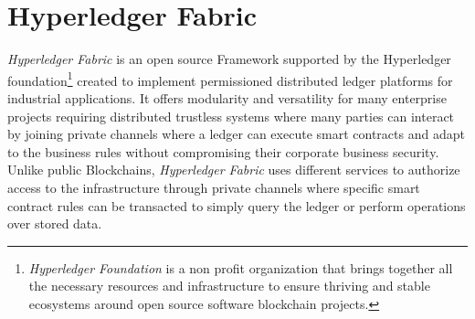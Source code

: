 \section{Hyperledger Fabric}
\emph{Hyperledger Fabric} is an open source Framework supported by the Hyperledger foundation\footnote{
\emph{Hyperledger Foundation}\cite{HyperledgerFoundation:online} is a non profit organization that brings together all the necessary resources and infrastructure to ensure thriving and stable ecosystems around open source software blockchain projects.} created to implement permissioned distributed ledger platforms for industrial applications. It offers modularity and versatility  for many enterprise projects requiring distributed trustless systems where many parties can interact by joining private channels where a ledger can execute smart contracts and adapt to the business rules without compromising their corporate business security\cite{HyperledgerFabric:online}.
Unlike public Blockchains, \emph{Hyperledger Fabric} uses different services to authorize access to the infrastructure through private channels where specific smart contract rules can be transacted to simply query the ledger or perform operations over stored data.